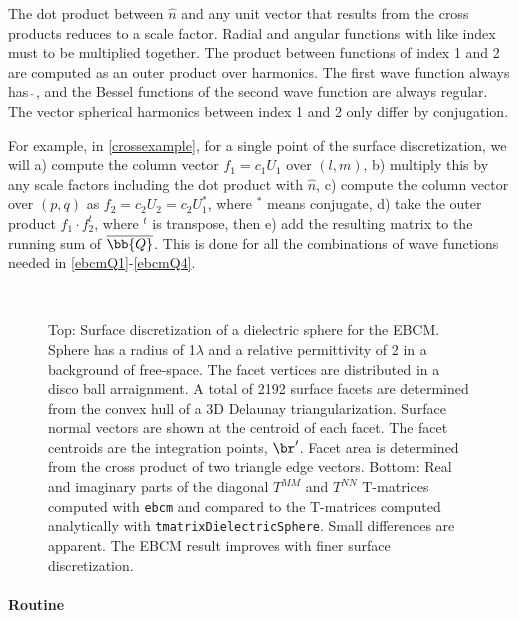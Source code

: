 \begin{itemize}
The dot product between $\hat{n}$ and any unit vector that results from the cross products reduces to a scale factor. Radial and angular functions with like index must to be multiplied together. The product between functions of index 1 and 2 are computed as an outer product over harmonics. The first wave function always has $\hat{\ }$, and the Bessel functions of the second wave function are always regular. The vector spherical harmonics between index 1 and 2 only differ by conjugation. 

For example, in \eqref{crossexample}, for a single point of the surface discretization, we will a) compute the column vector $f_1 = c_1U_1$ over $(l,m)$, b) multiply this by any scale factors including the dot product with $\hat{n}$, c) compute the column vector over $(p,q)$ as $f_2 = c_2 U_2 = c_2 U_1^*$, where $^*$ means conjugate, d) take the outer product $f_1 \cdot f_2^t$, where $^t$ is transpose, then e) add the resulting matrix to the running sum of $\overline{\bb{Q}}$. This is done for all the combinations of wave functions needed in \eqref{ebcmQ1}-\eqref{ebcmQ4}. 
\end{itemize}

\vspace{-5mm}

\begin{figure}[H] 
   \centering
    \\
   \caption{Top: Surface discretization of a dielectric sphere for the EBCM. Sphere has a radius of 1$\lambda$ and a relative permittivity of 2 in a background of free-space. The facet vertices are distributed in a disco ball arraignment. A total of 2192 surface facets are determined from the convex hull of a 3D Delaunay triangularization. Surface normal vectors are shown at the centroid of each facet. The facet centroids are the integration points, $\br'$. Facet area is determined from the cross product of two triangle edge vectors. Bottom: Real and imaginary parts of the diagonal $T^{MM}$ and $T^{NN}$ T-matrices computed with \texttt{ebcm} and compared to the T-matrices computed analytically with \texttt{tmatrixDielectricSphere}. Small differences are apparent. The EBCM result improves with finer surface discretization. }
   \label{ebcmcompare}
\end{figure}


\clearpage
\paragraph{Routine}

